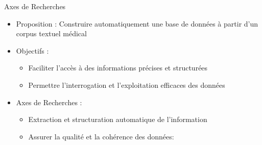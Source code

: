 \documentclass[english,french,table,aspectratio=43]{beamer}
\renewcommand{\_}{\ifincsname_\else\legacyunderscore\fi}
\begin{document}
\begin{frame}{Axes de Recherches}
  \begin{itemize}
      \item Proposition : Construire automatiquement une base de données à partir d'un corpus textuel médical
      \vfill\pause
      \item Objectifs :
      \begin{itemize}
          \item Faciliter l'accès à des informations précises et structurées
          \item Permettre l'interrogation et l'exploitation efficaces des données
      \end{itemize}
      \vfill\pause
      \item Axes de Recherches :
      \begin{itemize}
          \item Extraction et structuration automatique de l'information
          \item Assurer la qualité et la cohérence des données:
      \end{itemize}
  \end{itemize}
\end{frame}



\end{document}
